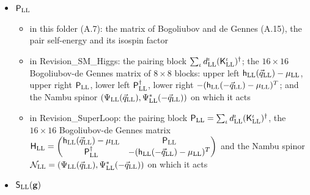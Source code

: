\documentclass[
  10pt,
]{article}
\providecommand{\tightlist}{%
  \setlength{\itemsep}{0pt}\setlength{\parskip}{0pt}}
\begin{document}
\begin{itemize}
  \begin{itemize}
  \tightlist
  \item
    in this folder (A.7, D): the Lorentz matrix of a unit bi-quaternion
    (9.2)
  \item
    in Revision\_SM\_Higgs: the real \(4\times4\) matrix of the Lorentz
    transformation
    \(\mathbf x\mapsto\mathbf g\mathbf x\mathbf g^\dagger\) of M31: its
    entry in row \(p\) and column \(p'\) is
    \(\tfrac12\mathrm{Re}\,\mathrm{tr}(\sigma^{\rm LL}_pM\sigma^{\rm LL}_{p'}M^\dagger)\)
    with \(M=M_{\rm LL}(\mathbf g)\)
  \item
    in Revision\_SuperLoop: the real \(4\times4\) matrix of the Lorentz
    transformation
    \(\mathbf x\mapsto\mathbf g\mathbf x\mathbf g^\dagger\) of
    \(\mathbb R^{1,3}_{\rm LL}\) in the coordinates
    \(x^0_{\rm LL},\dots,x^3_{\rm LL}\), for a unit bi-quaternion
    \(\mathbf g\): its entry in row \(p\) and column \(p'\)
    (\(p,p'=0,\dots,3\)) is
    \(\tfrac12\,\mathrm{Re}\,\mathrm{tr}(\sigma^{\rm LL}_pM_{\rm LL}(\mathbf g)\,\sigma^{\rm LL}_{p'}M_{\rm LL}(\mathbf g)^\dagger)\),
    with \(\sigma^{\rm LL}_0\) the unit matrix
  \end{itemize}
\item
  \(\mathsf P_{\rm LL}\)

  \begin{itemize}
  \tightlist
  \item
    in this folder (A.7): the matrix of Bogoliubov and de Gennes (A.15),
    the pair self-energy and its isospin factor
  \item
    in Revision\_SM\_Higgs: the pairing block
    \(\sum_\iota d^\iota_{\rm LL}(\mathsf K^\iota_{\rm LL})^\dagger\);
    the \(16\times16\) Bogoliubov-de Gennes matrix of \(8\times8\)
    blocks: upper left
    \(\mathsf h_{\rm LL}(\vec q_{\rm LL})-\mu_{\rm LL}\), upper right
    \(\mathsf P_{\rm LL}\), lower left \(\mathsf P_{\rm LL}^\dagger\),
    lower right
    \(-(\mathsf h_{\rm LL}(-\vec q_{\rm LL})-\mu_{\rm LL})^T\); and the
    Nambu spinor
    \((\Psi_{\rm LL}(\vec q_{\rm LL}),\Psi^*_{\rm LL}(-\vec q_{\rm LL}))\)
    on which it acts
  \item
    in Revision\_SuperLoop: the pairing block
    \(\mathsf P_{\rm LL}=\sum_\iota d^\iota_{\rm LL}(\mathsf K^\iota_{\rm LL})^\dagger\),
    the \(16\times16\) Bogoliubov-de Gennes matrix
    \(\mathsf H_{\rm LL}=\begin{pmatrix}\mathsf h_{\rm LL}(\vec q_{\rm LL})-\mu_{\rm LL}&\mathsf P_{\rm LL}\\\mathsf P_{\rm LL}^\dagger&-(\mathsf h_{\rm LL}(-\vec q_{\rm LL})-\mu_{\rm LL})^T\end{pmatrix}\)
    and the Nambu spinor
    \(\mathcal N_{\rm LL}=(\Psi_{\rm LL}(\vec q_{\rm LL}),\Psi_{\rm LL}^{*}(-\vec q_{\rm LL}))\)
    on which it acts
  \end{itemize}
\item
  \(\mathsf S_{\rm LL}(\mathbf g)\)


\end{itemize}
\end{document}
